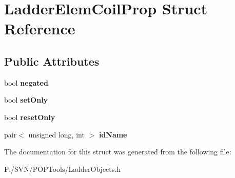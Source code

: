 \hypertarget{struct_ladder_elem_coil_prop}{\section{Ladder\-Elem\-Coil\-Prop Struct Reference}
\label{struct_ladder_elem_coil_prop}
}
\subsection*{Public Attributes}
\begin{DoxyCompactItemize}
\item 
\hypertarget{struct_ladder_elem_coil_prop_ae2157e10379b4fbbcf88eb5073bde778}{bool {\bfseries negated}}\label{struct_ladder_elem_coil_prop_ae2157e10379b4fbbcf88eb5073bde778}

\item 
\hypertarget{struct_ladder_elem_coil_prop_af87ddbff2987d1837754c81efee17e08}{bool {\bfseries set\-Only}}\label{struct_ladder_elem_coil_prop_af87ddbff2987d1837754c81efee17e08}

\item 
\hypertarget{struct_ladder_elem_coil_prop_a94c89687fff6b1492cba65b7b88bd7fa}{bool {\bfseries reset\-Only}}\label{struct_ladder_elem_coil_prop_a94c89687fff6b1492cba65b7b88bd7fa}

\item 
\hypertarget{struct_ladder_elem_coil_prop_ae89d0b9b1918430836144316af84bf48}{pair$<$ unsigned long, int $>$ {\bfseries id\-Name}}\label{struct_ladder_elem_coil_prop_ae89d0b9b1918430836144316af84bf48}

\end{DoxyCompactItemize}


The documentation for this struct was generated from the following file\-:\begin{DoxyCompactItemize}
\item 
F\-:/\-S\-V\-N/\-P\-O\-P\-Tools/Ladder\-Objects.\-h\end{DoxyCompactItemize}
